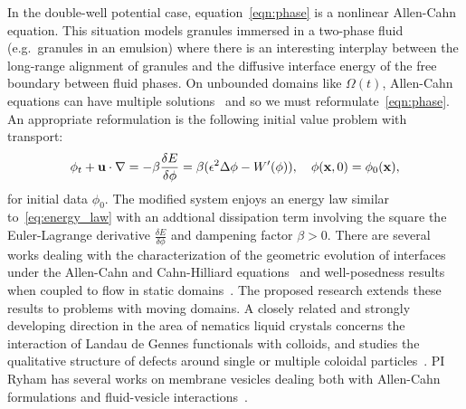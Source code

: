 In the double-well potential case, equation~\eqref{eqn:phase} is a
nonlinear Allen-Cahn equation. This situation models granules immersed
in a two-phase fluid (e.g.~granules in an emulsion) where there is an
interesting interplay between the long-range alignment of granules and
the diffusive interface energy of the free boundary between fluid
phases. On unbounded domains like $\Omega(t)$, Allen-Cahn equations can
have multiple solutions~\cite{Alama1997StationaryLS,
Alikakos2008OnAE, Bronsard1993OnTB, Byeon2014SolutionsOH, Byeon2013OnAP,
Alessio2005ENTIRESI, Trumper2007ExistenceOA, Benci2019MultipleSF} and so
we must reformulate~\eqref{eqn:phase}. An appropriate reformulation
is the following initial value problem with transport:
\begin{align}
  \label{eqn:phase_transport}
  \phi_t + \mathbf{u} \cdot \nabla
  = -\beta \frac{\delta E}{\delta \phi}
  = \beta(\epsilon^2 \Delta \phi - W'(\phi)),
  \quad \phi(\mathbf{x},0) = \phi_0(\mathbf{x}),
\end{align}
for initial data $\phi_0$. The modified system enjoys an energy law
similar to~\eqref{eq:energy_law} with an addtional dissipation term
involving the square the Euler-Lagrange derivative $\frac{\delta
E}{\delta \phi}$ and dampening factor $\beta > 0$. There are several
works dealing with the characterization of the geometric evolution of
interfaces under the Allen-Cahn and Cahn-Hilliard
equations~\cite{Christlieb2019CompetitionAC, Gavish2011CurvatureDF,
Dai2019WeakSF, Promislow2017ExistenceBA, Dai2015CompetitiveGE,
Promislow2012CriticalPO, Dai2022GeometricEO, Dai2020MinimizersFT,
Dai2013GeometricEO, Promislow2022UndulatedBI} and well-posedness
results when coupled to flow in static domains~\cite{Jiang2017TwophaseIF,
Liu2012StrongSF, Giorgini2019WellPosednessOA, Wu2022WellposednessOA,
Gal2010AsymptoticBO, Giorgini2020DiffuseIM, Giorgini2019UniquenessAR}.
The proposed research extends these results to problems with moving
domains. A closely related and strongly developing direction in the area
of nematics liquid crystals concerns the interaction of Landau de Gennes
functionals with colloids, and studies the qualitative structure of
defects around single or multiple coloidal
particles~\cite{doi:10.1098/rsta.2020.0432, Alama2015MinimizersOT,
Alama2021SaturnRD, PhysRevE.96.042702}. PI Ryham has several works on
membrane vesicles dealing both with Allen-Cahn formulations and
fluid-vesicle interactions~\cite{QiangDu09, RYHAM20112929, RyCoEi12,
Ryham2017OnTV}.


